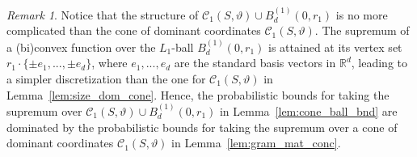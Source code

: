 \documentclass[ejsv2,noshowframe]{imsart}
\theoremstyle{plain}
\theoremstyle{definition}
\theoremstyle{remark}
\newtheorem{remark}{Remark}
\begin{document}
\begin{remark}
	\label{remark:cone_ball_union}
	Notice that the structure of $\mathcal{C}_1(S,\vartheta) \cup B_d^{(1)}(0,r_1)$ is no more complicated than the cone of dominant coordinates $\mathcal{C}_1(S,\vartheta)$. The supremum of a (bi)convex function over the $L_1$-ball $B_d^{(1)}(0,r_1)$ is attained at its vertex set $r_1\cdot \{\pm e_1,...,\pm e_d\}$, where $e_1,...,e_d$ are the standard basis vectors in $\mathbb{R}^d$, leading to a simpler discretization than the one for $\mathcal{C}_1(S,\vartheta)$ in Lemma~\ref{lem:size_dom_cone}. Hence, the probabilistic bounds for taking the supremum over $\mathcal{C}_1(S,\vartheta) \cup B_d^{(1)}(0,r_1)$ in Lemma~\ref{lem:cone_ball_bnd} are dominated by the probabilistic bounds for taking the supremum over a cone of dominant coordinates $\mathcal{C}_1(S,\vartheta)$ in Lemma~\ref{lem:gram_mat_conc}.
\end{remark}
\end{document}
